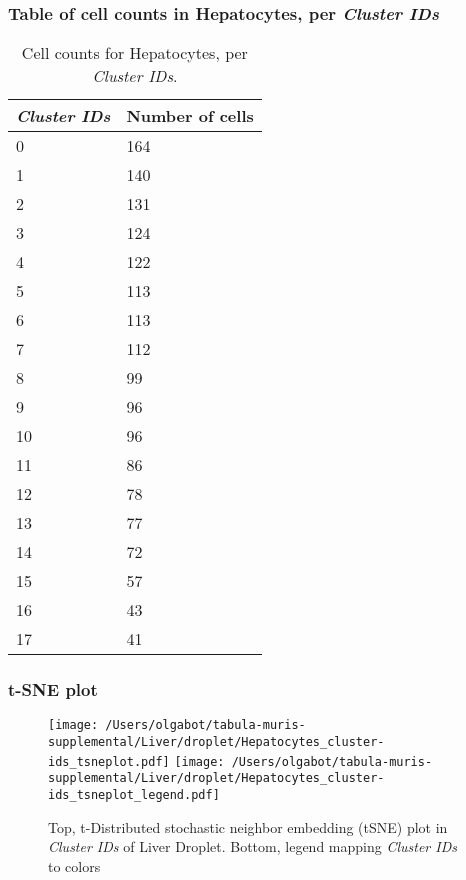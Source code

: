 \subsubsection{Table of cell counts in Hepatocytes, per \emph{Cluster IDs}}\begin{table}[h]
\centering
\label{my-label}
\begin{tabular}{@{}ll@{}}
\toprule

\emph{Cluster IDs}& Number of cells \\ \midrule
0 & 164 \\

1 & 140 \\

2 & 131 \\

3 & 124 \\

4 & 122 \\

5 & 113 \\

6 & 113 \\

7 & 112 \\

8 & 99 \\

9 & 96 \\

10 & 96 \\

11 & 86 \\

12 & 78 \\

13 & 77 \\

14 & 72 \\

15 & 57 \\

16 & 43 \\

17 & 41 \\
\bottomrule
\end{tabular}
\caption{Cell counts for Hepatocytes, per \emph{Cluster IDs}.}
\end{table}

\clearpage
\subsubsection{t-SNE plot}
\begin{figure}[h]
\centering
\texttt{[image: /Users/olgabot/tabula-muris-supplemental/Liver/droplet/Hepatocytes\_cluster-ids\_tsneplot.pdf]}
\texttt{[image: /Users/olgabot/tabula-muris-supplemental/Liver/droplet/Hepatocytes\_cluster-ids\_tsneplot\_legend.pdf]}
\caption{Top, t-Distributed stochastic neighbor embedding (tSNE) plot  in \emph{Cluster IDs} of Liver Droplet. Bottom, legend mapping \emph{Cluster IDs} to colors}
\end{figure}


